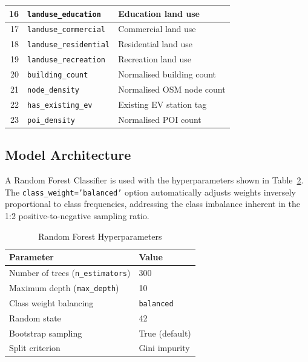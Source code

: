 \documentclass[conference]{IEEEtran}
\begin{document}
\begin{table}[htbp]
\begin{center}
\begin{tabular}{|r|l|l|}
16 & \texttt{landuse\_education} & Education land use \\
\hline
17 & \texttt{landuse\_commercial} & Commercial land use \\
\hline
18 & \texttt{landuse\_residential} & Residential land use \\
\hline
19 & \texttt{landuse\_recreation} & Recreation land use \\
\hline
20 & \texttt{building\_count} & Normalised building count \\
\hline
21 & \texttt{node\_density} & Normalised OSM node count \\
\hline
22 & \texttt{has\_existing\_ev} & Existing EV station tag \\
\hline
23 & \texttt{poi\_density} & Normalised POI count \\
\hline
\end{tabular}
\label{tab:features}
\end{center}
\end{table}

\subsection{Model Architecture}

A Random Forest Classifier is used with the hyperparameters shown in Table~\ref{tab:rf_params}. The \texttt{class\_weight='balanced'} option automatically adjusts weights inversely proportional to class frequencies, addressing the class imbalance inherent in the 1:2 positive-to-negative sampling ratio.

\begin{table}[htbp]
\caption{Random Forest Hyperparameters}
\begin{center}
\begin{tabular}{|l|l|}
\hline
\textbf{Parameter} & \textbf{Value} \\
\hline
Number of trees (\texttt{n\_estimators}) & 300 \\
\hline
Maximum depth (\texttt{max\_depth}) & 10 \\
\hline
Class weight balancing & \texttt{balanced} \\
\hline
Random state & 42 \\
\hline
Bootstrap sampling & True (default) \\
\hline
Split criterion & Gini impurity \\
\hline
\end{tabular}
\label{tab:rf_params}
\end{center}
\end{table}
\end{document}
